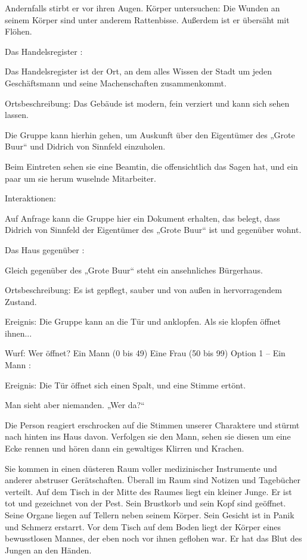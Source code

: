 Andernfalls stirbt er vor ihren Augen.
Körper untersuchen: Die Wunden an seinem Körper sind unter anderem Rattenbisse. Außerdem ist er übersäht mit Flöhen.

Das Handelsregister
:

Das Handelsregister ist der Ort, an dem alles Wissen der Stadt um jeden Geschäftsmann und seine Machenschaften zusammenkommt.

Ortsbeschreibung: Das Gebäude ist modern, fein verziert und kann sich sehen lassen.

Die Gruppe kann hierhin gehen, um Auskunft über den Eigentümer des „Grote Buur“ und Didrich von Sinnfeld einzuholen.

Beim Eintreten sehen sie eine Beamtin, die offensichtlich das Sagen hat, und ein paar um sie herum wuselnde Mitarbeiter.

Interaktionen:

Auf Anfrage kann die Gruppe hier ein Dokument erhalten, das belegt, dass Didrich von Sinnfeld der Eigentümer des „Grote Buur“ ist und gegenüber wohnt.

Das Haus gegenüber
:

Gleich gegenüber des „Grote Buur“ steht ein ansehnliches Bürgerhaus.

Ortsbeschreibung: Es ist gepflegt, sauber und von außen in hervorragendem Zustand.

Ereignis: Die Gruppe kann an die Tür und anklopfen. Als sie klopfen öffnet ihnen...

Wurf: Wer öffnet?
Ein Mann (0 bis 49)
Eine Frau (50 bis 99)
Option 1 – Ein Mann
:

Ereignis: Die Tür öffnet sich einen Spalt, und eine Stimme ertönt.

Man sieht aber niemanden. „Wer da?“

Die Person reagiert erschrocken auf die Stimmen unserer Charaktere und stürmt nach hinten ins Haus davon. Verfolgen sie den Mann, sehen sie diesen um eine Ecke rennen und hören dann ein gewaltiges Klirren und Krachen.

Sie kommen in einen düsteren Raum voller medizinischer Instrumente und anderer abstruser Gerätschaften. Überall im Raum sind Notizen und Tagebücher verteilt. Auf dem Tisch in der Mitte des Raumes liegt ein kleiner Junge. Er ist tot und gezeichnet von der Pest. Sein Brustkorb und sein Kopf sind geöffnet. Seine Organe liegen auf Tellern neben seinem Körper. Sein Gesicht ist in Panik und Schmerz erstarrt. Vor dem Tisch auf dem Boden liegt der Körper eines bewusstlosen Mannes, der eben noch vor ihnen geflohen war. Er hat das Blut des Jungen an den Händen.

